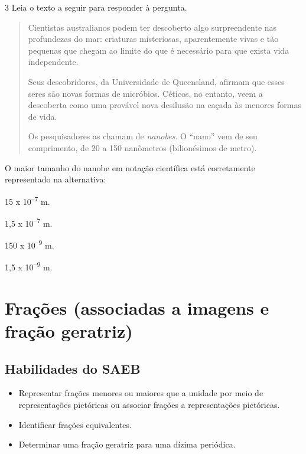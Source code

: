 \begin{escolha}
\num{3} Leia o texto a seguir para responder à pergunta.

\begin{quote}
Cientistas australianos podem ter descoberto algo surpreendente nas
profundezas do mar: criaturas misteriosas, aparentemente vivas e tão
pequenas que chegam ao limite do que é necessário para que exista vida
independente.

Seus descobridores, da Universidade de Queensland, afirmam que esses
seres são novas formas de micróbios. Céticos, no entanto, veem a
descoberta como uma provável nova desilusão na caçada às menores formas
de vida.

Os pesquisadores as chamam de \textit{nanobes}. O ``nano'' vem de seu 
comprimento, de 20 a 150 nanômetros (bilionésimos de metro).

\end{quote}

O maior tamanho do nanobe em notação científica está corretamente
representado na alternativa:

\begin{escolha}
\item 15 x 10\textsuperscript{--7} m.
\item 1,5 x 10\textsuperscript{--7} m.
\item 150 x 10\textsuperscript{--9} m.
\item 1,5 x 10\textsuperscript{--9} m.
\end{escolha}

\chapter{Frações (associadas a imagens e fração geratriz)}

\section{Habilidades do SAEB}

\begin{itemize}
  \item Representar frações menores ou maiores que a unidade por meio de
representações pictóricas ou associar frações a representações pictóricas.
  \item Identificar frações equivalentes.
  \item Determinar uma fração geratriz para uma dízima periódica.   
\end{itemize} 


\end{escolha}
